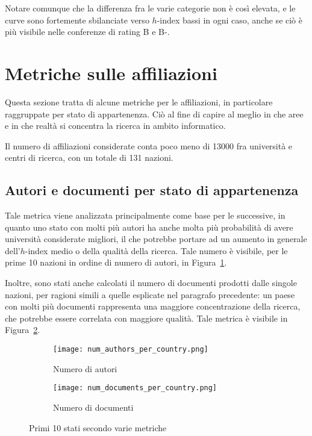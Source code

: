 Notare comunque che la differenza fra le varie categorie non è così elevata,
e le curve sono fortemente sbilanciate verso $h$-index bassi in ogni caso,
anche se ciò è più visibile nelle conferenze di rating B e B-.

\section{Metriche sulle affiliazioni}

Questa sezione tratta di alcune metriche per le affiliazioni, in particolare
raggruppate per stato di appartenenza. Ciò al fine di capire al meglio
in che aree e in che realtà si concentra la ricerca in ambito informatico.

Il numero di affiliazioni considerate conta poco meno di 13000 fra università
e centri di ricerca, con un totale di 131 nazioni.

\subsection{Autori e documenti per stato di appartenenza}
\label{ssec:authors-docs-per-country}

Tale metrica viene analizzata principalmente come base per le successive, in
quanto uno stato con molti più autori ha anche molta più probabilità di avere
università considerate migliori, il che potrebbe portare ad un aumento
in generale dell'$h$-index medio o della qualità della ricerca.
Tale numero è visibile, per le prime 10 nazioni in ordine di numero di autori,
in Figura~\ref{fig:num-authors-per-country}.

Inoltre, sono stati anche calcolati il numero di documenti prodotti dalle singole
nazioni, per ragioni simili a quelle esplicate nel paragrafo precedente: un
paese con molti più documenti rappresenta una maggiore concentrazione della
ricerca, che potrebbe essere correlata con maggiore qualità.
Tale metrica è visibile in Figura~\ref{fig:num-documents-per-country}.

\begin{figure}[tb]
  \centering
  \begin{subfigure}[b]{0.45\textwidth}
    \centering
    \texttt{[image: num\_authors\_per\_country.png]}
    \caption{Numero di autori}
    \label{fig:num-authors-per-country}
  \end{subfigure}
  \begin{subfigure}[b]{0.45\textwidth}
    \centering
    \texttt{[image: num\_documents\_per\_country.png]}
    \caption{Numero di documenti}
    \label{fig:num-documents-per-country}
  \end{subfigure}
  \caption{Primi 10 stati secondo varie metriche}
  \label{fig:top-10-country}
\end{figure}

